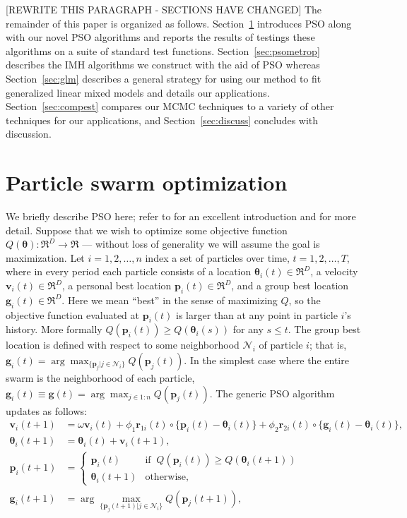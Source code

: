 \documentclass[12pt]{article}
\begin{document}
[REWRITE THIS PARAGRAPH - SECTIONS HAVE CHANGED]
The remainder of this paper is organized as follows. Section~\ref{sec:pso} introduces PSO along with our novel PSO algorithms and reports the results of testings these algorithms on a suite of standard test functions. Section~\ref{sec:psometrop} describes the IMH algorithms we construct with the aid of PSO whereas Section~\ref{sec:glm} describes a general strategy for using our method to fit generalized linear mixed models and details our applications. Section~\ref{sec:compest} compares our MCMC techniques to a variety of other techniques for our applications, and Section~\ref{sec:discuss} concludes with discussion. 



\section{Particle swarm optimization}\label{sec:pso}
We briefly describe PSO here; refer to \citet{blum2008swarm} for an excellent introduction and \citet{clerc2010particle} for more detail. Suppose that we wish to optimize some objective function $Q(\bm{\theta}):\Re^D\to\Re$ --- without loss of generality we will assume the goal is maximization. Let $i=1,2,\dots,n$ index a set of particles over time, $t=1,2,\dots,T$, where in every period each particle consists of a location $\bm{\theta}_i(t)\in \Re^D$, a velocity $\bm{v}_i(t) \in \Re^D$, a personal best location $\bm{p}_i(t)\in\Re^D$, and a group best location $\bm{g}_i(t)\in\Re^D$. Here we mean ``best'' in the sense of maximizing $Q$, so the objective function evaluated at $\bm{p}_i(t)$ is larger than at any point in particle $i$'s history. More formally $Q(\bm{p}_i(t)) \geq Q(\bm{\theta}_i(s))$ for any $s\leq t$. The group best location is defined with respect to some neighborhood $\mathcal{N}_i$ of particle $i$; that is, $\bm{g}_i(t) = \arg\max_{\{\bm{p}_j|j\in\mathcal{N}_i\}}Q(\bm{p}_j(t))$. In the simplest case where the entire swarm is the neighborhood of each particle, $\bm{g}_i(t)\equiv \bm{g}(t) = \arg\max_{j\in 1:n}Q(\bm{p}_j(t))$. The generic PSO algorithm updates as follows:
\begin{align}\label{eq:pso}
\bm{v}_i(t+1) &= \omega \bm{v}_i(t) + \phi_1 \bm{r}_{1i}(t)\circ\{\bm{p}_i(t) - \bm{\theta}_i(t)\} + \phi_2 \bm{r}_{2i}(t)\circ\{\bm{g}_i(t) - \bm{\theta}_i(t)\},\nonumber\\
\bm{\theta}_i(t+1) &= \bm{\theta}_i(t) + \bm{v}_i(t+1),\nonumber\\
\bm{p}_i(t+1) &= \begin{cases} \bm{p}_i(t)   & \mbox{if }\  Q(\bm{p}_i(t)) \ge Q(\bm{\theta}_i(t + 1))\\
                               \bm{\theta}_i(t+1) & \mbox{otherwise},
\end{cases}\nonumber\\
\bm{g}_i(t+1) &= \arg\max_{\{\bm{p}_j(t+1)|j\in\mathcal{N}_i\}}Q(\bm{p}_j(t+1)),
\end{align}
\end{document}
